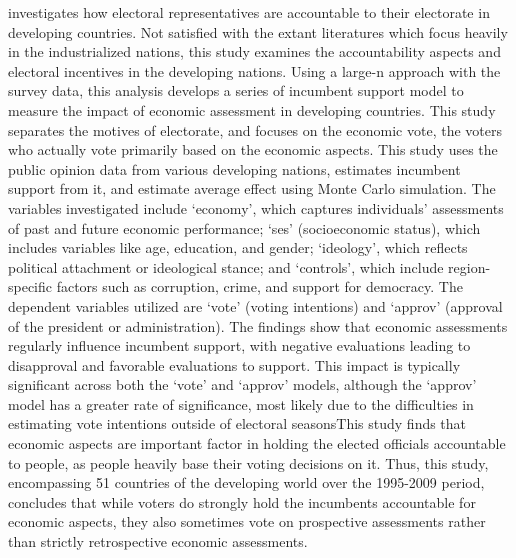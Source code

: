   investigates how electoral representatives are accountable to their electorate in developing countries. Not satisfied with the extant literatures which focus heavily in the industrialized nations, this study examines the accountability aspects and electoral incentives in the developing nations. Using a large-n approach with the survey data, this analysis develops a series of incumbent support model to measure the impact of economic assessment in developing countries. This study separates the motives of electorate, and focuses on the economic vote, the voters who actually vote primarily based on the economic aspects. This study uses the public opinion data from various developing nations, estimates incumbent support from it, and estimate average effect using Monte Carlo simulation.  The variables investigated include `economy', which captures individuals' assessments of past and future economic performance; `ses' (socioeconomic status), which includes variables like age, education, and gender; `ideology', which reflects political attachment or ideological stance; and `controls', which include region-specific factors such as corruption, crime, and support for democracy. The dependent variables utilized are `vote' (voting intentions) and `approv' (approval of the president or administration). The findings show that economic assessments regularly influence incumbent support, with negative evaluations leading to disapproval and favorable evaluations to support. This impact is typically significant across both the `vote' and `approv' models, although the `approv' model has a greater rate of significance, most likely due to the difficulties in estimating vote intentions outside of electoral seasonsThis study finds that economic aspects are important factor in holding the elected officials accountable to people, as people heavily base their voting decisions on it. Thus, this study, encompassing 51 countries of the developing world over the 1995-2009 period, concludes that while voters do strongly hold the incumbents accountable for economic aspects, they also sometimes vote on prospective assessments rather than strictly retrospective economic assessments.\\
